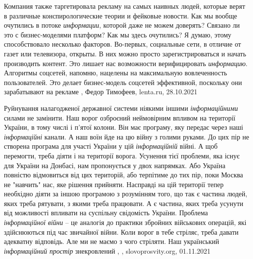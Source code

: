 Компания также таргетировала рекламу на самых наивных людей, которые верят в
различные конспирологические теории и фейковые новости. Как мы вообще очутились
в потоке \emph{информации}, которой даже не можем доверять? Связано ли это с
бизнес-моделями платформ?  Как мы здесь очутились? Я думаю, этому
способствовало несколько факторов.  Во-первых, социальные сети, в отличие от
газет или телевизора, открыты. В них можно просто зарегистрироваться и начать
производить контент. Это лишает нас возможности верифицировать
\emph{информацию}. Алгоритмы соцсетей, напомню, нацелены на максимальную
вовлеченность пользователей. Это делает бизнес-модель соцсетей эффективной,
поскольку они зарабатывают на рекламе
, 
Федор Тимофеев, lenta.ru, 28.10.2021

Руйнування налагодженої державної системи ніякими іншими \emph{інформаційними} силами
не замінити. Наш ворог озброєний неймовірним впливом на території України, в
тому числі і п’ятої колони. Він має програму, яку передає через наші
\emph{інформаційні} канали. А наш воїн йде на цю війну з голими руками. До цих пір не
створена програма для участі України у цій \emph{інформаційній} війні. А щоб
перемогти, треба діяти і на території ворога.  Усунення тієї проблеми, яка
існує для України на Донбасі, нам пропонується у двох напрямках. Або Україна
повністю відмовиться від цих територій, або терпітиме до тих пір, поки Москва
не "навчить" нас, яке рішення прийняти. Насправді на цій території тепер
необхідно діяти за іншою програмою з розумінням того, що так є частина людей,
яких треба рятувати, з якими треба працювати. А є частина, яких треба усунути
від можливості впливати на суспільну свідомість України.  Проблема
\emph{інформаційної війни} – це аналогія до практики збройних військових операцій, які
здійснюються під час звичайної війни. Коли ворог в тебе стріляє, треба давати
адекватну відповідь. Але ми не маємо з чого стріляти. Наш український
\emph{інформаційний простір} знекровлений
, , slovoprosvity.org, 01.11.2021

